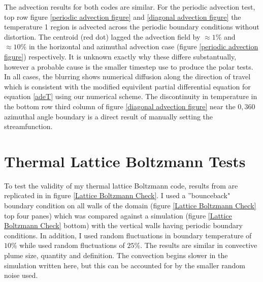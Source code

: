 \documentclass{article}
\begin{document}
\noindent The advection results for both codes are similar. For the periodic advection test, top row figure \ref{periodic advection figure} and \ref{diagonal advection figure} the temperature 1 region is advected across the periodic boundary conditions without distortion. The centroid (red dot) lagged the advection field by $\approx 1 \%$ and $\approx 10 \%$ in the horizontal and azimuthal advection case (figure \ref{periodic advection figure}) respectively. It is unknown exactly why these differe substantually, however a probable cause is the smaller timestep use to produce the polar tests. In all cases, the blurring shows numerical diffusion along the direction of travel which is consistent with the modified equivilent partial differential equation for equation \ref{adeT} using our numerical scheme. The discontinuity in temperature in the bottom row third column of figure \ref{diagonal advection figure} near the $0, 360$ azimuthal angle boundary is a direct result of manually setting the streamfunction.

\section*{Thermal Lattice Boltzmann Tests}
To test the validity of my thermal lattice Boltzmann code, results from  \cite{mora2017simulation} are replicated in in figure \ref{Lattice Boltzmann 
Check}. I used a ''bounceback" boundary condition on all walls of the domain (figure \ref{Lattice Boltzmann Check} top four panes) which was compared 
against a simulation (figure \ref{Lattice Boltzmann Check} bottom) with the vertical walls having periodic boundary conditions. In addition, I used 
random fluctuations in boundary temperature of $10 \%$ while \cite{mora2017simulation} used random fluctuations of $25 \%$. The results are similar in 
convective plume size, quantity and definition. The convection begins slower in the simulation written here, but this can be accounted for by the smaller 
random noise used.
\end{document}
